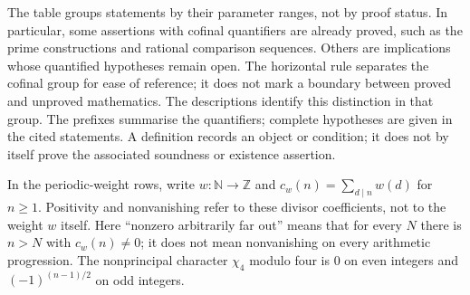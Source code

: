 \documentclass[11pt]{article}
\theoremstyle{plain}
\theoremstyle{definition}
\theoremstyle{remark}
\begin{document}
The table groups statements by their parameter ranges, not by proof
status. In particular, some assertions with cofinal quantifiers are
already proved, such as the prime constructions and rational comparison
sequences. Others are implications whose quantified hypotheses remain
open. The horizontal rule separates the cofinal group for ease of
reference; it does not mark a boundary between proved and unproved
mathematics. The descriptions identify this distinction in that group.
The prefixes summarise the quantifiers; complete hypotheses are given in
the cited statements. A definition records an object or condition; it does not by itself prove
the associated soundness or existence assertion.

\begingroup
In the periodic-weight rows, write
$w:\mathbb N\to\mathbb Z$ and
$c_w(n)=\sum_{d\mid n}w(d)$ for $n\ge1$. Positivity and nonvanishing
refer to these divisor coefficients, not to the weight $w$ itself.
Here ``nonzero arbitrarily far out'' means that for every $N$ there is
$n>N$ with $c_w(n)\ne0$; it does not mean nonvanishing on every
arithmetic progression. The nonprincipal character $\chi_4$ modulo four
is $0$ on even integers and $(-1)^{(n-1)/2}$ on odd integers.
\end{document}
